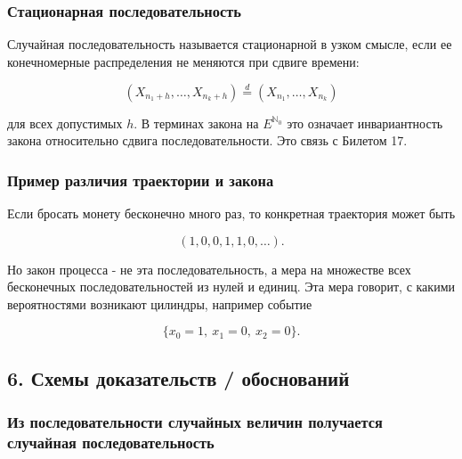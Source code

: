 \documentclass[
  11pt,
  a4paper,
]{article}
\begin{document}
\subsubsection{Стационарная
последовательность}\label{ux441ux442ux430ux446ux438ux43eux43dux430ux440ux43dux430ux44f-ux43fux43eux441ux43bux435ux434ux43eux432ux430ux442ux435ux43bux44cux43dux43eux441ux442ux44c}

Случайная последовательность называется стационарной в узком смысле,
если ее конечномерные распределения не меняются при сдвиге времени:

\[
(X_{n_1+h},\ldots,X_{n_k+h})
\stackrel d=
(X_{n_1},\ldots,X_{n_k})
\]

для всех допустимых \(h\). В терминах закона на \(E^{\mathbb N_0}\) это
означает инвариантность закона относительно сдвига последовательности.
Это связь с Билетом 17.

\subsubsection{Пример различия траектории и
закона}\label{ux43fux440ux438ux43cux435ux440-ux440ux430ux437ux43bux438ux447ux438ux44f-ux442ux440ux430ux435ux43aux442ux43eux440ux438ux438-ux438-ux437ux430ux43aux43eux43dux430}

Если бросать монету бесконечно много раз, то конкретная траектория может
быть

\[
(1,0,0,1,1,0,\ldots).
\]

Но закон процесса - не эта последовательность, а мера на множестве всех
бесконечных последовательностей из нулей и единиц. Эта мера говорит, с
какими вероятностями возникают цилиндры, например событие

\[
\{x_0=1,\ x_1=0,\ x_2=0\}.
\]

\subsection{6. Схемы доказательств /
обоснований}\label{ux441ux445ux435ux43cux44b-ux434ux43eux43aux430ux437ux430ux442ux435ux43bux44cux441ux442ux432-ux43eux431ux43eux441ux43dux43eux432ux430ux43dux438ux439}

\subsubsection{Из последовательности случайных величин получается
случайная
последовательность}\label{ux438ux437-ux43fux43eux441ux43bux435ux434ux43eux432ux430ux442ux435ux43bux44cux43dux43eux441ux442ux438-ux441ux43bux443ux447ux430ux439ux43dux44bux445-ux432ux435ux43bux438ux447ux438ux43d-ux43fux43eux43bux443ux447ux430ux435ux442ux441ux44f-ux441ux43bux443ux447ux430ux439ux43dux430ux44f-ux43fux43eux441ux43bux435ux434ux43eux432ux430ux442ux435ux43bux44cux43dux43eux441ux442ux44c}
\end{document}
